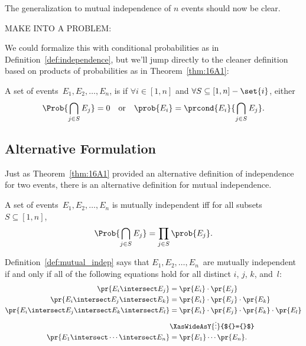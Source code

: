 The generalization to mutual independence of $n$ events should now be clear.

\begin{editingnotes}
MAKE INTO A PROBLEM:

We could formalize this with conditional probabilities
as in Definition~\ref{def:independence}, but we'll jump directly to
the cleaner definition based on products of probabilities as in
Theorem~\ref{thm:16A1}:

\begin{definition}\label{def:mutual_independence}
A set of events~$E_1, E_2, \dots, E_n$, is 
if $\forall i \in [1, n]$ and $\forall S \subseteq [1, n] - \set{i}$,
either
\begin{equation*}
    \Prob{\bigcap_{j \in S} E_j} = 0
\quad
\text{or}
\quad
    \prob{E_i} = \prcond{E_i}{\bigcap_{j \in S} E_j}.
\end{equation*}
\end{definition}

\subsection{Alternative Formulation}

Just as Theorem~\ref{thm:16A1} provided an alternative definition of
independence for two events, there is an alternative definition for
mutual independence.


\begin{definition}\label{def:mutual_indep}
A set of events~$E_1, E_2, \dots, E_n$ is mutually independent iff
for all subsets $S \subseteq [1, n]$,
\begin{equation*}
    \Prob{\bigcap_{j \in S} E_j} = \prod_{j \in S} \prob{E_j}.
\end{equation*}
\end{definition}

\iffalse
The proof of Theorem~\ref{thm:16A2} uses induction and reasoning
similar to the proof of Theorem~\ref{thm:16A1}.  We will not include
the details here.
\fi

Definition~\ref{def:mutual_indep} says that $E_1, E_2, \dots, E_n$~are
mutually independent if and only if all of the following equations
hold for all distinct $i$, $j$, $k$, and~$l$:
%
\begin{align*}
\pr{E_i \intersect E_j}
    & = \pr{E_i} \cdot \pr{E_j}
 \\
\pr{E_i \intersect E_j \intersect E_k}
    & = \pr{E_i} \cdot \pr{E_j} \cdot \pr{E_k}
 \\
\pr{E_i \intersect E_j \intersect E_k \intersect E_l}
    & = \pr{E_i} \cdot \pr{E_j} \cdot \pr{E_k} \cdot \pr{E_l}
 \\
    & \XasWideAsY{\vdots}{${}={}$} \\
\pr{E_1 \intersect \cdots \intersect E_n} & = \pr{E_1} \cdots \pr{E_n}.
\end{align*}


\end{editingnotes}
